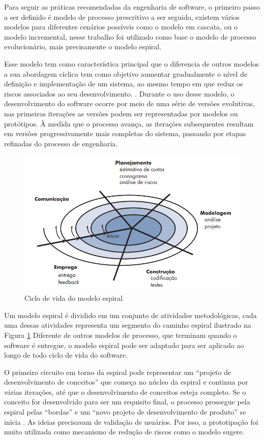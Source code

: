 Para seguir as práticas recomendadas da engenharia de software, o primeiro passo a ser definido é modelo de processo prescritivo a ser seguido, existem vários modelos para diferentes cenários possíveis como o modelo em cascata, ou o modelo incremental, nesse trabalho foi utilizado como base o modelo de processo evolucionário, mais precisamente o modelo espiral.

Esse modelo tem como característica principal que o diferencia de outros modelos a sua abordagem cíclica tem como objetivo aumentar gradualmente o nível de definição e implementação de um sistema, ao mesmo tempo em que reduz os riscos associados ao seu desenvolvimento. \cite{maxim2021engenharia}. Durante o uso desse modelo, o desenvolvimento do software ocorre por meio de uma série de versões evolutivas, nas primeiras iterações as versões podem ser representadas por modelos ou protótipos. À medida que o processo avança, as iterações subsequentes resultam em versões progressivamente mais completas do sistema, passando por etapas refinadas do processo de engenharia.

\begin{figure}[h!]
    \centering
    \includegraphics[width=0.9\linewidth]{figuras/spiral-model.png}
    \caption{Ciclo de vida do modelo espiral}
    \label{spiral-model}
\end{figure}
Um modelo espiral é dividido em um conjunto de atividades metodológicas, cada uma dessas atividades representa um segmento do caminho espiral ilustrado na Figura \ref{spiral-model} Diferente de outros modelos de processo, que terminam quando o software é entregue, o modelo espiral pode ser adaptado para ser aplicado ao longo de todo ciclo de vida do software.

O primeiro circuito em torno da espiral pode representar um “projeto de desenvolvimento de conceitos” que começa no núcleo da espiral e continua por várias iterações, até que o desenvolvimento de conceitos esteja completo. Se o conceito for desenvolvido para ser um requisito final, o processo prossegue pela espiral pelas “bordas” e um “novo projeto de desenvolvimento de produto” se inicia \cite{maxim2021engenharia}. As ideias precisavam de validação de usuários. Por isso, a prototipação foi muito utilizada como mecanismo de redução de riscos como o modelo sugere. 

